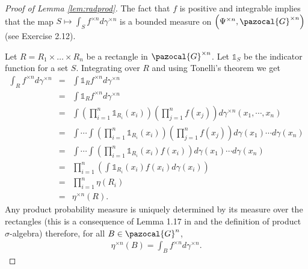 \documentclass{article} %
\def\l{\left}
\def\r{\right}
\def\sG{\pazocal{G}}
\theoremstyle{definition}
\begin{document}
\begin{proof}[Proof of Lemma \ref{lem:radprod}]
	The fact that $f$ is positive and integrable implies that the map $S \mapsto \int_S f^{\times n}d\gamma^{\times n}$ is a bounded measure on $\l(\Psi^{\times n}, \sG^{\times n}\r)$ (see \cite{folland99} Exercise 2.12). 

Let $R= R_1 \times\ldots\times R_n$ be a rectangle in $\sG^{\times n}$. Let $\mathds{1}_S$ be the indicator function for a set $S$. Integrating over $R$ and using Tonelli's theorem we get
\begin{eqnarray*}
	\int_R f^{\times n} d \gamma^{\times n}
	&=& \int \mathds{1}_Rf^{\times n}d \gamma^{\times n}\\
	&=& \int \mathds{1}_Rf^{\times n}d \gamma^{\times n}\\
	&=& \int \l(\prod_{i=1}^n \mathds{1}_{R_i}(x_i)\r)\l(\prod_{j=1}^n f(x_j)\r)d \gamma^{\times n}\left( x_1,\cdots,x_n \right)\\
	&=& \int\cdots\int \l(\prod_{i=1}^n \mathds{1}_{R_i}(x_i)\r)\l(\prod_{j=1}^n f(x_j)\r)d \gamma(x_1)\cdots d\gamma(x_n)\\
	&=& \int\cdots\int \l(\prod_{i=1}^n \mathds{1}_{R_i}(x_i) f(x_i)\r)d \gamma(x_1)\cdots d\gamma(x_n)\\
	&=&  \prod_{i=1}^n\l(\int \mathds{1}_{R_i}(x_i) f(x_i)d \gamma(x_i)\r)\\
	&=&  \prod_{i=1}^n\eta(R_i)\\
	&=&  \eta^{\times n}(R).
\end{eqnarray*}
Any product probability measure is uniquely determined by its measure over the rectangles (this is a consequence of Lemma 1.17 in \cite{fomp} and the definition of product $\sigma$-algebra) therefore, for all $B\in \sG^{n}$,
\begin{eqnarray*}
	\eta^{\times n}\left( B \right) = \int_B f^{\times n} d\gamma^{\times n}.
\end{eqnarray*}

\end{proof}


\end{document}
